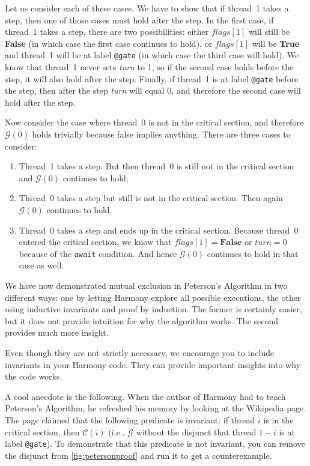 \documentclass{report}
\begin{document}
Let us consider each of these cases.
We have to show that if thread~1 takes a step, then one of those
cases must hold after the step.
In the first case, if thread~1 takes a step, there are two possibilities:
either $flags[1]$ will still be \textbf{False} (in which case the first case
continues to hold), or $flags[1]$ will be \textbf{True}
and thread~1 will be at label \texttt{@gate} (in which case the third case
will hold).
We know that thread~1 never sets \textit{turn} to 1, so
if the second case holds before the step, it will also hold after the step.
Finally, if thread~1 is at label \texttt{@gate} before the step, then after
the step \textit{turn} will equal 0, and therefore the second case will hold
after the step.

Now consider the case where thread~0 is not in the critical section,
and therefore $\mathcal{G}(0)$ holds trivially because false implies
anything.
There are three cases to consider:
\begin{enumerate}
\item Thread~1 takes a step.  But then thread~0 is still not in the critical
section and $\mathcal{G}(0)$ continues to hold;
\item Thread~0 takes a step but still is not in the critical section.
Then again $\mathcal{G}(0)$ continues to hold.
\item Thread~0 takes a step and ends up in the critical section.
Because thread~0 entered the critical section, we know that
$\mathit{flags}[1] = \textbf{False}$ or $\mathit{turn} = 0$ because
of the \texttt{await} condition.
And hence $\mathcal{G}(0)$ continues to hold in that case as well.
\end{enumerate}

We have now demonstrated mutual exclusion in Peterson's Algorithm in two
different ways: one by letting Harmony explore all possible executions, the
other using inductive invariants and proof by induction.  The former
is certainly easier, but it does not provide intuition for why the
algorithm works.  The second provides much more insight.

Even though they are not strictly necessary, we encourage you
to include invariants in your Harmony code.
They can provide important insights into why the code works.

A cool anecdote is the following.  When the author of Harmony had to teach
Peterson's Algorithm, he refreshed his memory by looking at the Wikipedia
page.  The page claimed that the following predicate is invariant:
if thread $i$ is in the critical section, then $\mathcal{C}(i)$ (i.e.,
$\mathcal{G}$ without the disjunct that thread $1-i$ is at label \texttt{@gate}).
To demonstrate that this predicate is not invariant, you can remove the
disjunct from \autoref{fig:petersonproof} and run it to get a
counterexample.
\end{document}
